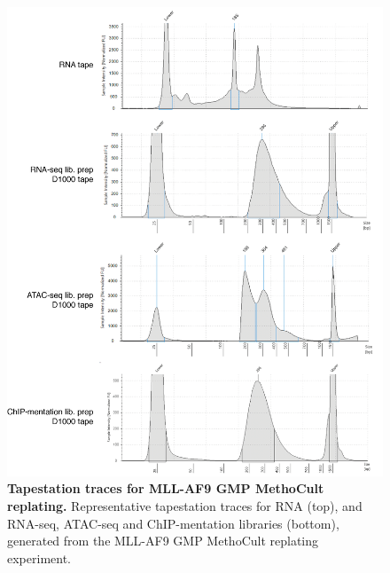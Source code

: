 \begin{figure}[p]
    \centering
    \includegraphics[width=\textwidth,height=\textheight,keepaspectratio]{figures/appendix/app_methocult-tapestation.png}
    \caption[{Tapestation traces for MLL-AF9 GMP MethoCult replating.}]
    {\textbf{Tapestation traces for MLL-AF9 GMP MethoCult replating.} 
    Representative tapestation traces for RNA (top), and RNA-seq, ATAC-seq and ChIP-mentation libraries (bottom), generated from the MLL-AF9 GMP MethoCult replating experiment.
    }
    \label{fig:app_methocult-tapestation}
\end{figure}
\clearpage

